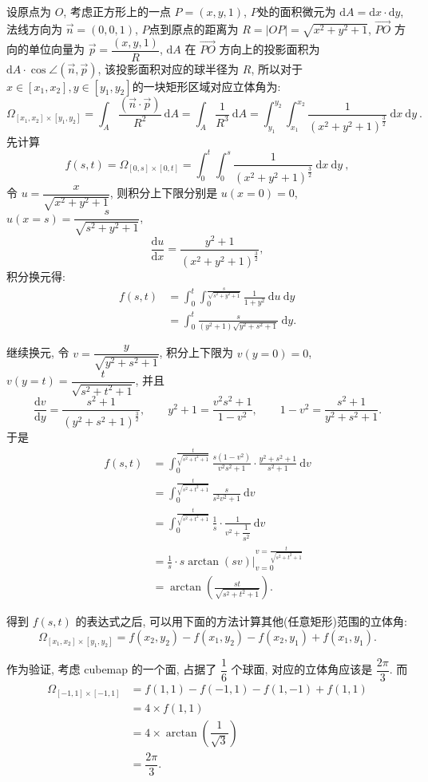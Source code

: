 设原点为 $O$, 考虑正方形上的一点 $P=(x,y,1)$, 
$P$处的面积微元为 $\mathrm{d}A = \mathrm{d}x\cdot\mathrm{d}y$, 法线方向为 $\vec{n} = (0,0,1)$, 
$P$点到原点的距离为 $R = |OP| = \sqrt{x^2+y^2+1}$, $\vec{PO}$ 方向的单位向量为 $\vec{p} = \dfrac{(x,y,1)}{R}$, 
$\mathrm{d}A$ 在 $\vec{PO}$ 方向上的投影面积为 $\mathrm{d}A\cdot\cos\angle(\vec{n},\vec{p})$, 该投影面积对应的球半径为 $R$, 所以对于 $x\in[x_1,x_2], y\in[y_1,y_2]$的一块矩形区域对应立体角为:
\[
\Omega_{[x_1,x_2]\times[y_1,y_2]} = \int_A\frac{(\vec{n}\cdot\vec{p})}{R^2} \ \mathrm{d}A = \int_A\frac{1}{R^3} \ \mathrm{d}A = \int_{y_1}^{y_2}{\int_{x_1}^{x_2}\frac{1}{(x^2+y^2+1)^{\frac{3}{2}}}\ \mathrm{d}x}\ \mathrm{d}y \ .
\]
先计算 
\[f(s,t) = \Omega_{[0,s]\times[0,t]} = \int_0^t{\int_0^s\frac{1}{(x^2+y^2+1)^{\frac{3}{2}}}\ \mathrm{d}x}\ \mathrm{d}y\ , \]
令 $u = \dfrac{x}{\sqrt{x^2+y^2+1}}$, 则积分上下限分别是 $u(x=0) = 0$, $u(x=s)=\dfrac{s}{\sqrt{s^2+y^2+1}}$, 
\[\dfrac{\mathrm{d}u}{\mathrm{d}x} = \dfrac{y^2+1}{(x^2+y^2+1)^\frac{3}{2}} ,\] 
积分换元得:
\begin{align*}
f(s,t) &= \int_0^t{\int_0^{\frac{s}{\sqrt{s^2+y^2+1}}}{\frac{1}{1+y^2}}\ \mathrm{d}u}\ \mathrm{d}y\\
&=\int_0^t{\frac{s}{(y^2+1)\sqrt{y^2+s^2+1}}}\ \mathrm{d}y . 
\end{align*}

继续换元, 令 $v = \dfrac{y}{\sqrt{y^2+s^2+1}} $, 积分上下限为 $v(y=0) = 0$, $v(y=t) = \dfrac{t}{\sqrt{s^2+t^2+1}}$, 并且
\[\frac{\mathrm{d}v}{\mathrm{d}y} = \frac{s^2+1}{(y^2+s^2+1)^\frac{3}{2}} ,\qquad y^2 + 1 = \frac{v^2s^2+1}{1-v^2} ,\qquad 1-v^2=\frac{s^2+1}{y^2+s^2+1} .\]
于是
\begin{align*}
f(s,t) &= \int_0^\frac{t}{\sqrt{s^2+t^2+1}} {\frac{s(1-v^2)}{v^2s^2+1}\cdot\frac{y^2+s^2+1}{s^2+1}}\ \mathrm{d}v \\ 
&= \int_0^\frac{t}{\sqrt{s^2+t^2+1}}{\frac{s}{s^2v^2+1}}\ \mathrm{d}v\\
&= \int_0^\frac{t}{\sqrt{s^2+t^2+1}}{\frac{1}{s}\cdot\frac{1}{v^2+\dfrac{1}{s^2}}}\ \mathrm{d}v\\
&= \frac{1}{s}\cdot s\arctan(sv)\bigg|_{v=0}^{v=\frac{t}{\sqrt{s^2+t^2+1}}}\\
&= \arctan(\frac{st}{\sqrt{s^2+t^2+1}}) .
\end{align*}

得到 $f(s,t)$ 的表达式之后, 可以用下面的方法计算其他(任意矩形)范围的立体角:
\[\Omega_{[x_1,x_2]\times[y_1,y_2]} = f(x_2,y_2) - f(x_1,y_2) - f(x_2,y_1) + f(x_1,y_1) .\]

作为验证, 考虑 cubemap 的一个面, 占据了 $\dfrac{1}{6}$ 个球面, 对应的立体角应该是 $\dfrac{2\pi}{3}$. 而
\begin{align*}
\Omega_{[-1,1]\times[-1,1]} &= f(1,1) - f(-1,1) - f(1,-1) + f(1,1) \\
& = 4\times f(1,1) \\
&= 4\times \arctan(\dfrac{1}{\sqrt{3}}) \\
& = \dfrac{2\pi}{3} .
\end{align*} 

